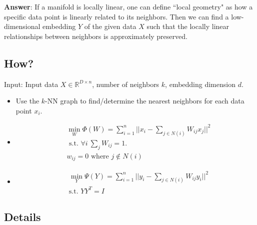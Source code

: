 \textbf{Answer}: If a manifold is locally linear, one can define
``local geometry" as how a specific data point is linearly related to
its neighbors. Then we can find a low-dimensional embedding $Y$ of the
given data $X$ such that the locally linear relationships between
neighbors is approximately preserved. 

\subsection*{How?}
Input: Input data $X\in \mathbb{R}^{D\times n}$, number of neighbors
$k$, embedding dimension $d$. 
\begin{itemize}
\item Use the $k$-NN graph to find/determine the nearest neighbors for
  each data point $x_i$. 
\item 
\begin{align*}
&\min_{W} \Phi(W) = \sum_{i=1}^n \bigg|\bigg|x_i - \sum_{j\in N(i)}
  W_{ij} x_j\bigg|\bigg|^2\\ 
&\text{ s.t. } \forall i \ \sum_{j} W_{ij}=1.\\
&w_{ij}=0 \text{ where } j \not \in N(i)
\end{align*}
\item 
\begin{align*}
&\min_{Y} \Psi(Y) = \sum_{i=1}^{n} ||y_i - \sum_{j\in N(i)} W_{ij}
  y_i||^2\\ 
&\text{s.t. } Y Y^T = I 
\end{align*}
\end{itemize}


\subsection*{Details}
